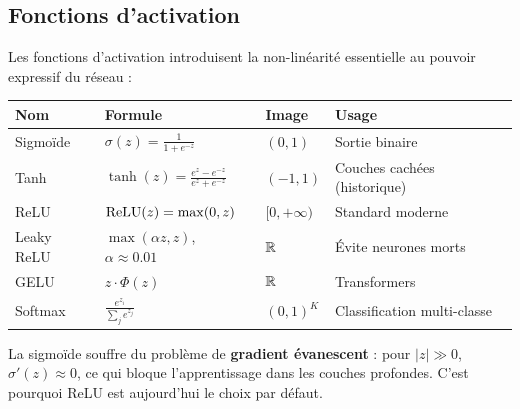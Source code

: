 \subsection{Fonctions d'activation}

Les fonctions d'activation introduisent la non-lin\'earit\'e essentielle au pouvoir expressif du r\'eseau :

\begin{center}
\begin{tabular}{llll}
\toprule
\textbf{Nom} & \textbf{Formule} & \textbf{Image} & \textbf{Usage} \\
\midrule
Sigmo\"ide & $\sigma(z) = \frac{1}{1+e^{-z}}$ & $(0,1)$ & Sortie binaire \\[6pt]
Tanh & $\tanh(z) = \frac{e^z - e^{-z}}{e^z + e^{-z}}$ & $(-1,1)$ & Couches cach\'ees (historique) \\[6pt]
ReLU & $\mathrm{ReLU}(z) = \max(0,z)$ & $[0,+\infty)$ & Standard moderne \\[6pt]
Leaky ReLU & $\max(\alpha z, z)$, $\alpha\approx 0.01$ & $\mathbb{R}$ & \'Evite neurones morts \\[6pt]
GELU & $z \cdot \Phi(z)$ & $\mathbb{R}$ & Transformers \\[6pt]
Softmax & $\frac{e^{z_i}}{\sum_j e^{z_j}}$ & $(0,1)^K$ & Classification multi-classe \\
\bottomrule
\end{tabular}
\end{center}

\begin{center}
\end{center}

\begin{attention}
La sigmo\"ide souffre du probl\`eme de \textbf{gradient \'evanescent} : pour $|z| \gg 0$, $\sigma'(z) \approx 0$, ce qui bloque l'apprentissage dans les couches profondes. C'est pourquoi ReLU est aujourd'hui le choix par d\'efaut.
\end{attention}

